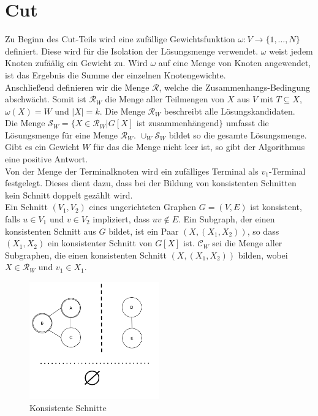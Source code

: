 \section{Cut}
\label{sec:st_cut}
Zu Beginn des Cut-Teils wird eine zufällige Gewichtsfunktion $\omega:V\rightarrow \{1,\dots,N\}$ definiert. 
Diese wird für die Isolation der Lösungsmenge verwendet. 
$\omega$ weist jedem Knoten zufäälig ein Gewicht zu. 
Wird $\omega$ auf eine Menge von Knoten angewendet, ist das Ergebnis die Summe der einzelnen Knotengewichte.\\
Anschließend definieren wir die Menge $\mathcal{R}$, welche die Zusammenhangs-Bedingung abschwächt. 
Somit ist $\mathcal{R}_W$ die Menge aller Teilmengen von $X$ aus $V$ mit $T \subseteq X$, $\omega(X)=W$ und $|X|=k$. Die Menge $\mathcal{R}_W$ beschreibt alle Lösungskandidaten.\\
Die Menge $\mathcal{S}_W=\{X \in \mathcal{R}_W | G[X]$ ist zusammenhängend$\}$ umfasst die Lösungsmenge für eine Menge $\mathcal{R}_W$. 
$\cup_W \mathcal{S}_W$ bildet so die gesamte Lösungsmenge. 
Gibt es ein Gewicht $W$ für das die Menge nicht leer ist, so gibt der Algorithmus eine positive Antwort.\\
Von der Menge der Terminalknoten wird ein zufälliges Terminal als $v_1$-Terminal festgelegt. 
Dieses dient dazu, dass bei der Bildung von konsistenten Schnitten kein Schnitt doppelt gezählt wird.\\
Ein Schnitt $(V_1,V_2)$ eines ungerichteten Graphen $G=(V,E)$ ist konsistent, falls $u \in V_1$ und $v \in V_2$ impliziert, dass $uv \notin E$. 
Ein Subgraph, der einen konsistenten Schnitt aus $G$ bildet, ist ein Paar $(X,(X_1,X_2))$, so dass $(X_1,X_2)$ ein konsistenter Schnitt von $G[X]$ ist.
$\mathcal{C}_W$ sei die Menge aller Subgraphen, die einen konsistenten Schnitt $(X,(X_1,X_2))$ bilden, wobei $X\in \mathcal{R}_W$ und $v_1 \in X_1$.
\begin{figure}
  \centering
    \includegraphics[width=0.5\textwidth]{./imgs/terminal_v1.png}
  	\caption{Konsistente Schnitte}
	\label{fig:st_cut}
\end{figure}

